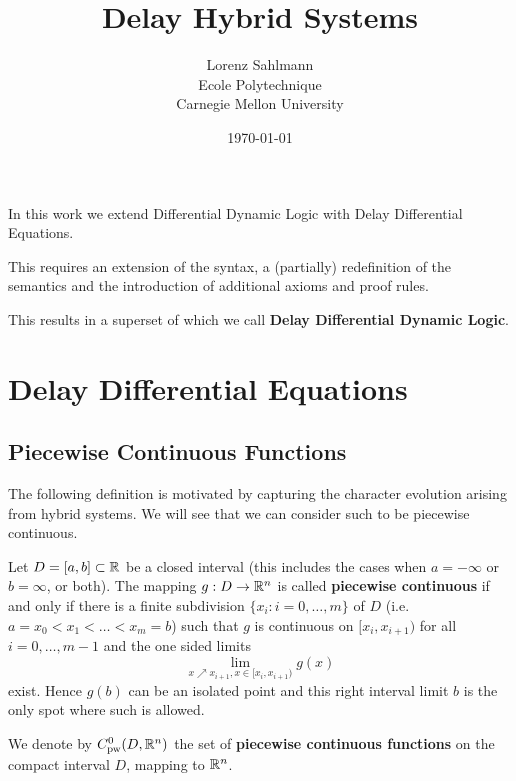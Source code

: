 \documentclass[10pt]{article}
\begin{document}
\title{Delay Hybrid Systems}

\author{Lorenz Sahlmann\\ Ecole Polytechnique\\ Carnegie Mellon University}
\date{\today}

\maketitle


In this work we extend Differential Dynamic Logic with Delay Differential Equations.

This requires an extension of the syntax, a (partially) redefinition of the semantics and the introduction of additional axioms and proof rules.

This results in a superset of \dL which we call \textbf{Delay Differential Dynamic Logic}.

\section{Delay Differential Equations}\label{delay-differential-equations}

\subsection{Piecewise Continuous Functions}\label{piecewise-continuous-functions}
The following definition is motivated by capturing the character evolution arising from hybrid systems. We will see that we can consider such to be piecewise continuous.

\begin{definition}
    \label{definition-piecewise-continuous}

    Let $D=[a,b]\subset\mathbb{R}$ be a closed interval (this includes the cases when $a=-\infty$ or $b=\infty$, or both). The mapping $g:D\rightarrow\mathbb{R}^n$ is called \textbf{piecewise continuous} if and only if there is a finite subdivision $\{x_i:i=0,\ldots,m\}$ of $D$ (i.e.\ $a=x_0<x_1<\ldots<x_m=b$) such that $g$ is continuous on $[x_i,x_{i+1})$ for all $i=0,\ldots,m-1$ and the one sided limits
    \begin{equation}
        \lim_{x\nearrow x_{i+1}, x\in[x_i,x_{i+1})}g(x)
    \end{equation}
    exist. Hence $g(b)$ can be an isolated point and this right interval limit $b$ is the only spot where such is allowed.

    We denote by $C^0_\text{pw}(D,\mathbb{R}^n)$ the set of \textbf{piecewise continuous functions} on the compact interval $D$, mapping to $\mathbb{R}^n$.

\end{definition}
\end{document}
